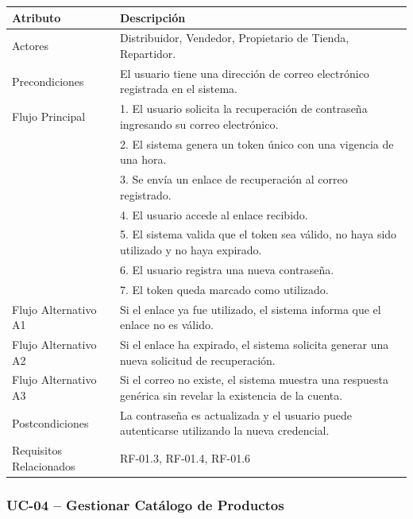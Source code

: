 \documentclass[12pt,a4paper]{report}
\begin{document}
\begin{longtable}{|p{4cm}|p{10cm}|}
\hline
\textbf{Atributo} & \textbf{Descripción} \\ \hline
Actores & Distribuidor, Vendedor, Propietario de Tienda, Repartidor. \\ \hline
Precondiciones & El usuario tiene una dirección de correo electrónico registrada en el sistema. \\ \hline
Flujo Principal &
1. El usuario solicita la recuperación de contraseña ingresando su correo electrónico.\\
& 2. El sistema genera un token único con una vigencia de una hora.\\
& 3. Se envía un enlace de recuperación al correo registrado.\\
& 4. El usuario accede al enlace recibido.\\
& 5. El sistema valida que el token sea válido, no haya sido utilizado y no haya expirado.\\
& 6. El usuario registra una nueva contraseña.\\
& 7. El token queda marcado como utilizado. \\ \hline
Flujo Alternativo A1 & Si el enlace ya fue utilizado, el sistema informa que el enlace no es válido. \\ \hline
Flujo Alternativo A2 & Si el enlace ha expirado, el sistema solicita generar una nueva solicitud de recuperación. \\ \hline
Flujo Alternativo A3 & Si el correo no existe, el sistema muestra una respuesta genérica sin revelar la existencia de la cuenta. \\ \hline
Postcondiciones & La contraseña es actualizada y el usuario puede autenticarse utilizando la nueva credencial. \\ \hline
Requisitos Relacionados & RF-01.3, RF-01.4, RF-01.6 \\ \hline
\end{longtable}
\subsubsection{UC-04 -- Gestionar Catálogo de Productos}
\end{document}
